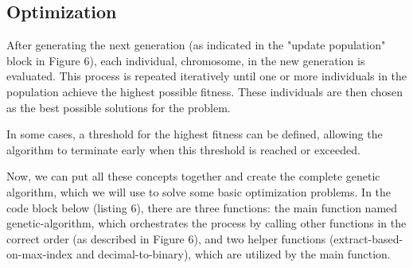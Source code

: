 \documentclass[12pt]{article}
\begin{document}
\subsection{Optimization}

After generating the next generation (as indicated in the "update population" block in Figure 6), each individual, chromosome, in the new generation is evaluated. This process is repeated iteratively until one or more individuals in the population achieve the highest possible fitness. These individuals are then chosen as the best possible solutions for the problem.

In some cases, a threshold for the highest fitness can be defined, allowing the algorithm to terminate early when this threshold is reached or exceeded.

Now, we can put all these concepts together and create the complete genetic algorithm, which we will use to solve some basic optimization problems. In the code block below (listing 6), there are three functions: the main function named genetic-algorithm, which orchestrates the process by calling other functions in the correct order (as described in Figure 6), and two helper functions (extract-based-on-max-index and decimal-to-binary), which are utilized by the main function.
\end{document}
